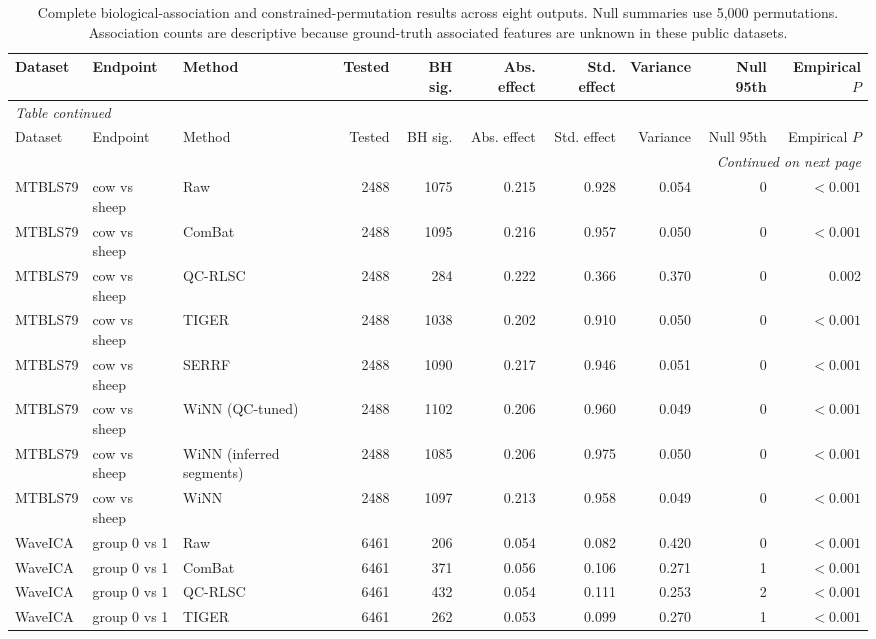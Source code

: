 \begin{landscape}
\tiny
\begin{longtable}{lllrrrrrrr}
\caption{Complete biological-association and constrained-permutation results across eight outputs. Null summaries use 5,000 permutations. Association counts are descriptive because ground-truth associated features are unknown in these public datasets.}\label{tab:supp_association}\\
\toprule
Dataset & Endpoint & Method & Tested & BH sig. & Abs. effect & Std. effect & Variance & Null 95th & Empirical $P$ \\
\midrule
\endfirsthead
\multicolumn{10}{l}{\textit{Table \thetable{} continued}}\\
\toprule
Dataset & Endpoint & Method & Tested & BH sig. & Abs. effect & Std. effect & Variance & Null 95th & Empirical $P$ \\
\midrule
\endhead
\midrule
\multicolumn{10}{r}{\textit{Continued on next page}}\\
\endfoot
\bottomrule
\endlastfoot
MTBLS79 & cow vs sheep & Raw & 2488 & 1075 & 0.215 & 0.928 & 0.054 & 0 & $<0.001$ \\
MTBLS79 & cow vs sheep & ComBat & 2488 & 1095 & 0.216 & 0.957 & 0.050 & 0 & $<0.001$ \\
MTBLS79 & cow vs sheep & QC-RLSC & 2488 & 284 & 0.222 & 0.366 & 0.370 & 0 & 0.002 \\
MTBLS79 & cow vs sheep & TIGER & 2488 & 1038 & 0.202 & 0.910 & 0.050 & 0 & $<0.001$ \\
MTBLS79 & cow vs sheep & SERRF & 2488 & 1090 & 0.217 & 0.946 & 0.051 & 0 & $<0.001$ \\
MTBLS79 & cow vs sheep & WiNN (QC-tuned) & 2488 & 1102 & 0.206 & 0.960 & 0.049 & 0 & $<0.001$ \\
MTBLS79 & cow vs sheep & WiNN (inferred segments) & 2488 & 1085 & 0.206 & 0.975 & 0.050 & 0 & $<0.001$ \\
MTBLS79 & cow vs sheep & WiNN & 2488 & 1097 & 0.213 & 0.958 & 0.049 & 0 & $<0.001$ \\
WaveICA & group 0 vs 1 & Raw & 6461 & 206 & 0.054 & 0.082 & 0.420 & 0 & $<0.001$ \\
WaveICA & group 0 vs 1 & ComBat & 6461 & 371 & 0.056 & 0.106 & 0.271 & 1 & $<0.001$ \\
WaveICA & group 0 vs 1 & QC-RLSC & 6461 & 432 & 0.054 & 0.111 & 0.253 & 2 & $<0.001$ \\
WaveICA & group 0 vs 1 & TIGER & 6461 & 262 & 0.053 & 0.099 & 0.270 & 1 & $<0.001$ \\

\end{longtable}
\end{landscape}
